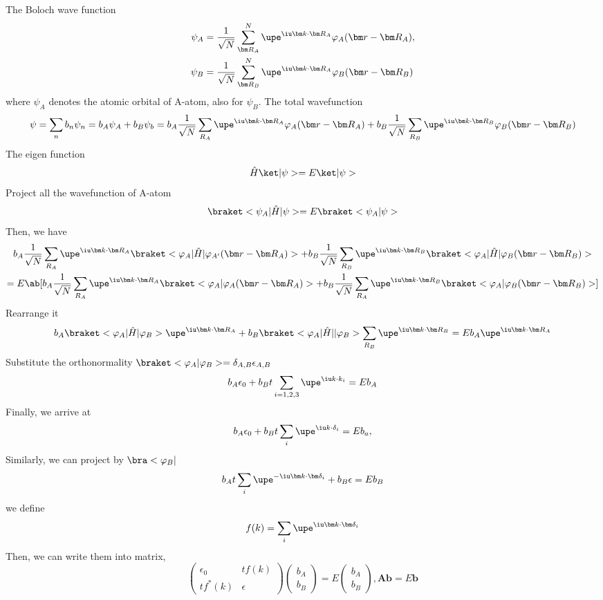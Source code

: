 The Boloch wave function
\begin{align}
  \psi_A & = \frac1{\sqrt N} \sum_{\bm R_A}^N \upe^{\iu\bm k \cdot \bm R_A}
    \varphi_A(\bm r - \bm R_A),\\
  \psi_B & = \frac1{\sqrt N} \sum_{\bm R_B}^N \upe^{\iu\bm k \cdot \bm R_A}
    \varphi_B(\bm r - \bm R_B)
\end{align}
where $\psi_A$ denotes the atomic orbital of A-atom, also for $\psi_B$.
The total wavefunction
\begin{equation}
  \psi = \sum_n b_n\psi_n = b_A \psi_A + b_B \psi_b
= b_A \frac1{\sqrt N} \sum_{R_A} \upe^{\iu\bm k \cdot\bm R_A}
  \varphi_A(\bm r - \bm R_A) +
  b_B \frac1{\sqrt N} \sum_{R_B} \upe^{\iu\bm k \cdot\bm R_B}
  \varphi_B(\bm r - \bm R_B)
\end{equation}
The eigen function
\[
  \hat H\ket|\psi> = E\ket|\psi>
\]
Project all the wavefunction of A-atom
\[
  \braket<\psi_A|\hat H|\psi> = E\braket<\psi_A|\psi>
\]
Then, we have
\begin{multline}
  b_A \frac1{\sqrt N} \sum_{R_A} \upe^{\iu\bm k \cdot\bm R_A}
  \braket<\varphi_A|\hat H|\varphi_{A'}(\bm r - \bm R_A)> +
  b_B \frac1{\sqrt N} \sum_{R_B} \upe^{\iu\bm k \cdot \bm R_B}
  \braket<\varphi_A|\hat H|\varphi_B(\bm r - \bm R_B)>\\
= E\ab[b_A\frac1{\sqrt N} \sum_{R_A}\upe^{\iu\bm k\cdot \bm R_A}
    \braket<\varphi_A|\varphi_A(\bm r - \bm R_A)> +
    b_B \frac1{\sqrt N} \sum_{R_A} \upe^{\iu\bm k\cdot\bm R_B}
    \braket<\varphi_A|\varphi_B(\bm r - \bm R_B)>]
\end{multline}
Rearrange it
\[
  b_A\braket<\varphi_A|\hat H|\varphi_B> \upe^{\iu\bm k\cdot \bm R_A}
+ b_B\braket<\varphi_A|\hat H||\varphi_B> \sum_{R_B}\upe^{\iu\bm k\cdot \bm R_B}
= E b_A \upe^{\iu\bm k\cdot\bm R_A}
\]
Substitute the orthonormality
$\braket<\varphi_A|\varphi_B> = \delta_{A,B}\epsilon_{A,B}$
\[
  b_A\epsilon_0 + b_Bt\sum_{i = 1,2,3} \upe^{\iu k\cdot k_i} = Eb_A
\]
Finally, we arrive at
\begin{equation}
  b_A\epsilon_0 + b_Bt\sum_i \upe^{\iu k\cdot \delta_i} = E b_a,
\end{equation}
Similarly, we can project by $\bra<\varphi_B|$
\begin{equation}
  b_At\sum_i \upe^{-\iu \bm k\cdot \bm \delta_i} + b_B\epsilon = E b_B
\end{equation}
we define
\[
  f(k) = \sum_i \upe^{\iu\bm k \cdot \bm \delta_i}
\]
Then, we can write them into matrix,
\begin{equation}
  \begin{pmatrix}
    \epsilon_0 & tf(k)\\
    tf^*(k) & \epsilon
  \end{pmatrix}
  \begin{pmatrix}
    b_A\\b_B
  \end{pmatrix} = E
  \begin{pmatrix}
    b_A\\b_B
  \end{pmatrix}, \mathbf A\bm b = E\bm b
\end{equation}
